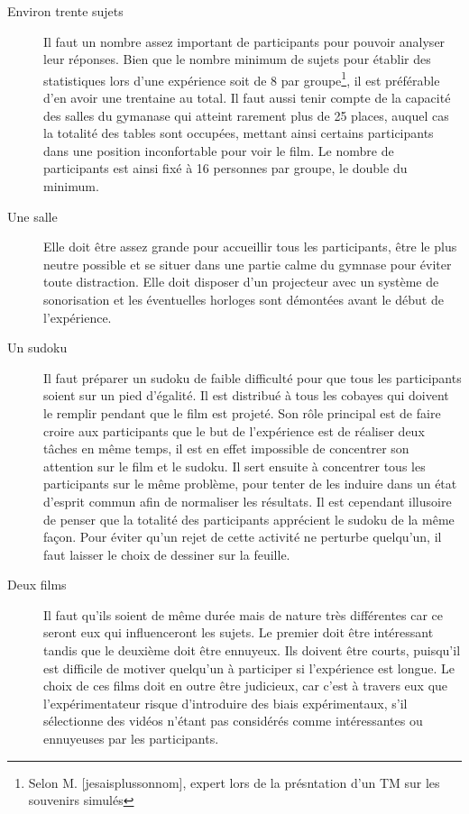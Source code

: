 \documentclass[12pt,fleqn,oneside,openany]{book} %
\begin{document}
\begin{description}
	\item[Environ trente sujets] Il faut un nombre assez important de participants pour pouvoir analyser leur réponses. Bien que le nombre minimum de sujets pour établir des statistiques lors d'une expérience soit de 8 par groupe\footnote{Selon M. [jesaisplussonnom], expert lors de la présntation d'un TM sur les souvenirs simulés}, il est préférable d'en avoir une trentaine au total. Il faut aussi tenir compte de la capacité des salles du gymanase qui atteint rarement plus de 25 places, auquel cas la totalité des tables sont occupées, mettant ainsi certains participants dans une position inconfortable pour voir le film. Le nombre de participants est ainsi fixé à 16 personnes par groupe, le double du minimum.
	\item[Une salle] Elle doit être assez grande pour accueillir tous les participants, être le plus neutre possible et se situer dans une partie calme du gymnase pour éviter toute distraction. Elle doit disposer d'un projecteur avec un système de sonorisation et les éventuelles horloges sont démontées avant le début de l'expérience.
	\item[Un sudoku] Il faut préparer un sudoku de faible difficulté pour que tous les participants soient sur un pied d'égalité. Il est distribué à tous les cobayes qui doivent le remplir pendant que le film est projeté. Son rôle principal est de faire croire aux participants que le but de l'expérience est de réaliser deux tâches en même temps, il est en effet impossible de concentrer son attention sur le film et le sudoku. Il sert ensuite à concentrer tous les participants sur le même problème, pour tenter de les induire dans un état d'esprit commun afin de normaliser les résultats. Il est cependant illusoire de penser que la totalité des participants apprécient le sudoku de la même façon. Pour éviter qu'un rejet de cette activité ne perturbe quelqu'un, il faut laisser le choix de dessiner sur la feuille.
	\item[Deux films] Il faut qu'ils soient de même durée mais de nature très différentes car ce seront eux qui influenceront les sujets. Le premier doit être intéressant tandis que le deuxième doit être ennuyeux. Ils doivent être courts, puisqu'il est difficile de motiver quelqu'un à participer si l'expérience est longue. Le choix de ces films doit en outre être judicieux, car c'est à travers eux que l'expérimentateur risque d'introduire des biais expérimentaux, s'il sélectionne des vidéos n'étant pas considérés comme intéressantes ou ennuyeuses par les participants. 


\end{description}
\end{document}
